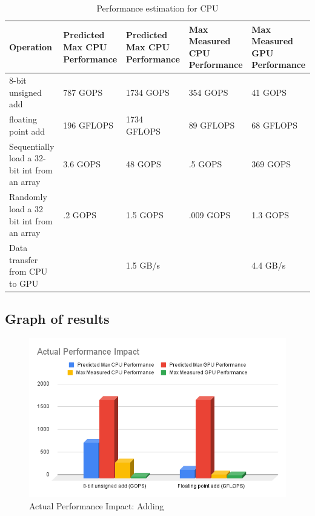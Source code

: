 \documentclass{article}
\begin{document}
  \begin{table}[h]
    \centering
    \begin{tabular}{p{}p{}p{}p{}p{}}
      \toprule
      Operation & Predicted Max CPU Performance & Predicted Max CPU Performance & Max Measured CPU Performance & Max Measured GPU Performance \\
      \midrule
      8-bit unsigned add & 787 GOPS & 1734 GOPS & 354 GOPS & 41 GOPS \\
      floating point add & 196 GFLOPS & 1734 GFLOPS & 89 GFLOPS & 68 GFLOPS \\
      Sequentially load a 32-bit int from an array & 3.6 GOPS & 48 GOPS & .5 GOPS & 369 GOPS \\
      Randomly load a 32 bit int from an array & .2 GOPS & 1.5 GOPS & .009 GOPS & 1.3 GOPS \\
      Data transfer from CPU to GPU & & 1.5 GB/s & & 4.4 GB/s \\
      \bottomrule
    \end{tabular}
    \caption{Performance estimation for CPU}
  \end{table}

\subsection{Graph of results}

\begin{figure}[h!t]
    \centering
    \includegraphics[width=1\textwidth]{add.png}
    \caption{Actual Performance Impact: Adding}
    \label{fig:add}
\end{figure}
\end{document}
